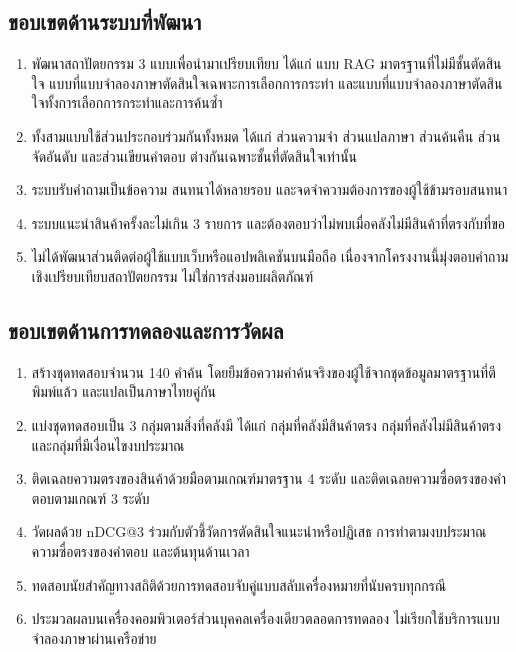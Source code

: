 \subsection{ขอบเขตด้านระบบที่พัฒนา}

\begin{enumerate}[label=\arabic*)]
    \item พัฒนาสถาปัตยกรรม 3 แบบเพื่อนำมาเปรียบเทียบ ได้แก่ แบบ RAG มาตรฐานที่ไม่มีชั้นตัดสินใจ แบบที่แบบจำลองภาษาตัดสินใจเฉพาะการเลือกการกระทำ และแบบที่แบบจำลองภาษาตัดสินใจทั้งการเลือกการกระทำและการค้นซ้ำ
    \item ทั้งสามแบบใช้ส่วนประกอบร่วมกันทั้งหมด ได้แก่ ส่วนความจำ ส่วนแปลภาษา ส่วนค้นคืน ส่วนจัดอันดับ และส่วนเขียนคำตอบ ต่างกันเฉพาะชั้นที่ตัดสินใจเท่านั้น
    \item ระบบรับคำถามเป็นข้อความ สนทนาได้หลายรอบ และจดจำความต้องการของผู้ใช้ข้ามรอบสนทนา
    \item ระบบแนะนำสินค้าครั้งละไม่เกิน 3 รายการ และต้องตอบว่าไม่พบเมื่อคลังไม่มีสินค้าที่ตรงกับที่ขอ
    \item ไม่ได้พัฒนาส่วนติดต่อผู้ใช้แบบเว็บหรือแอปพลิเคชันบนมือถือ เนื่องจากโครงงานนี้มุ่งตอบคำถามเชิงเปรียบเทียบสถาปัตยกรรม ไม่ใช่การส่งมอบผลิตภัณฑ์
\end{enumerate}

\subsection{ขอบเขตด้านการทดลองและการวัดผล}

\begin{enumerate}[label=\arabic*)]
    \item สร้างชุดทดสอบจำนวน 140 คำค้น โดยยืมข้อความคำค้นจริงของผู้ใช้จากชุดข้อมูลมาตรฐานที่ตีพิมพ์แล้ว \cite{reddy2022esci, chen2022wands} และแปลเป็นภาษาไทยคู่กัน
    \item แบ่งชุดทดสอบเป็น 3 กลุ่มตามสิ่งที่คลังมี ได้แก่ กลุ่มที่คลังมีสินค้าตรง กลุ่มที่คลังไม่มีสินค้าตรง และกลุ่มที่มีเงื่อนไขงบประมาณ
    \item ติดเฉลยความตรงของสินค้าด้วยมือตามเกณฑ์มาตรฐาน 4 ระดับ \cite{reddy2022esci} และติดเฉลยความซื่อตรงของคำตอบตามเกณฑ์ 3 ระดับ
    \item วัดผลด้วย nDCG@3 \cite{jarvelin2002ndcg} ร่วมกับตัวชี้วัดการตัดสินใจแนะนำหรือปฏิเสธ การทำตามงบประมาณ ความซื่อตรงของคำตอบ และต้นทุนด้านเวลา
    \item ทดสอบนัยสำคัญทางสถิติด้วยการทดสอบจับคู่แบบสลับเครื่องหมายที่นับครบทุกกรณี \cite{smucker2007comparison}
    \item ประมวลผลบนเครื่องคอมพิวเตอร์ส่วนบุคคลเครื่องเดียวตลอดการทดลอง ไม่เรียกใช้บริการแบบจำลองภาษาผ่านเครือข่าย
\end{enumerate}

